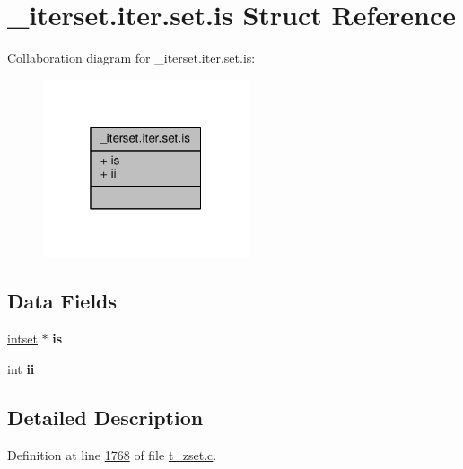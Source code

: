 \hypertarget{structzsetopsrc_1_1__iterset_8iter_8set_8is}{}\section{\+\_\+iterset.\+iter.\+set.\+is Struct Reference}
\label{structzsetopsrc_1_1__iterset_8iter_8set_8is}


Collaboration diagram for \+\_\+iterset.\+iter.\+set.\+is\+:\nopagebreak
\begin{figure}[H]
\begin{center}
\leavevmode
\includegraphics[width=172pt]{structzsetopsrc_1_1__iterset_8iter_8set_8is__coll__graph}
\end{center}
\end{figure}
\subsection*{Data Fields}
\begin{DoxyCompactItemize}
\item 
\mbox{\label{structzsetopsrc_1_1__iterset_8iter_8set_8is_aa2a551a6458a8de22446cc76d639a9e9}} 
\hyperlink{structintset}{intset} $\ast$ {\bfseries is}
\item 
\mbox{\label{structzsetopsrc_1_1__iterset_8iter_8set_8is_a7e98b8a17c0aad30ba64d47b74e2a6c1}} 
int {\bfseries ii}
\end{DoxyCompactItemize}


\subsection{Detailed Description}


Definition at line \hyperlink{t__zset_8c_source_l01768}{1768} of file \hyperlink{t__zset_8c_source}{t\+\_\+zset.\+c}.



